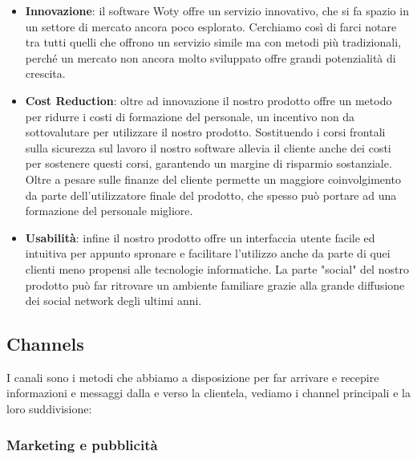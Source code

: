 \begin{itemize}
\item \textbf{Innovazione}: il software Woty offre un servizio innovativo, che si fa spazio in un settore di mercato ancora poco esplorato. Cerchiamo così di farci notare tra tutti quelli che offrono un servizio simile ma con metodi più tradizionali, perché un mercato non ancora molto sviluppato offre grandi potenzialità di crescita.
\item \textbf{Cost Reduction}: oltre ad innovazione il nostro prodotto offre un metodo per ridurre i costi di formazione del personale, un incentivo non da sottovalutare per utilizzare il nostro prodotto. Sostituendo i corsi frontali sulla sicurezza sul lavoro il nostro software allevia il cliente anche dei costi per sostenere questi corsi, garantendo un margine di risparmio sostanziale. Oltre a pesare sulle finanze del cliente permette un maggiore coinvolgimento da parte dell'utilizzatore finale del prodotto, che spesso può portare ad una formazione del personale migliore.
\item \textbf{Usabilità}: infine il nostro prodotto offre un interfaccia utente facile ed intuitiva per appunto spronare e facilitare l'utilizzo anche da parte di quei clienti meno propensi alle tecnologie informatiche. La parte "social" del nostro prodotto può far ritrovare un ambiente familiare grazie alla grande diffusione dei social network degli ultimi anni.
\end{itemize}

\subsection{Channels}

I canali sono i metodi che abbiamo a disposizione per far arrivare e recepire informazioni e messaggi dalla e verso la clientela, vediamo i channel principali e la loro suddivisione:

\subsubsection{Marketing e pubblicità}

